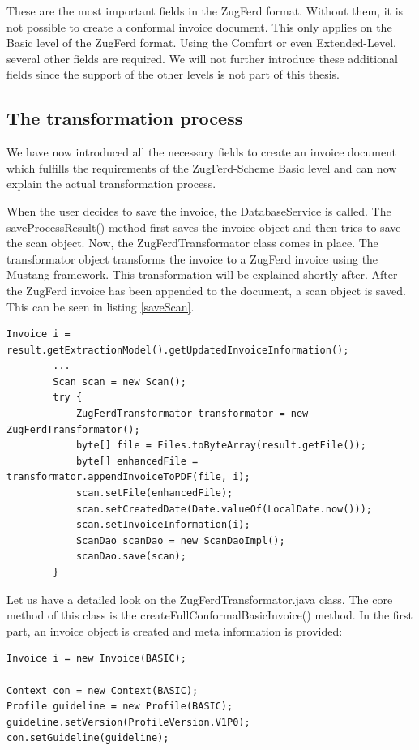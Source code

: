 These are the most important fields in the ZugFerd format. Without them, it is not possible to create a conformal invoice document. This only applies on the Basic level of the ZugFerd format. Using the Comfort or even Extended-Level, several other fields are required. We will not further introduce these additional fields since the support of the other levels is not part of this thesis. 

\subsection{The transformation process}
\label{sec5.7.2}

We have now introduced all the necessary fields to create an invoice document which fulfills the requirements of the ZugFerd-Scheme Basic level and can now explain the actual transformation process. 

When the user decides to save the invoice, the DatabaseService is called. The saveProcessResult() method first saves the invoice object and then tries to save the scan object. Now, the ZugFerdTransformator class comes in place. The transformator object transforms the invoice to a ZugFerd invoice using the Mustang framework. This transformation will be explained shortly after. After the ZugFerd invoice has been appended to the document, a scan object is saved. This can be seen in listing \ref{saveScan}.

\begin{lstlisting}[caption={}, label={saveScan}]
        Invoice i = result.getExtractionModel().getUpdatedInvoiceInformation();
        ...
        Scan scan = new Scan();
        try {
            ZugFerdTransformator transformator = new ZugFerdTransformator();
            byte[] file = Files.toByteArray(result.getFile());
            byte[] enhancedFile = transformator.appendInvoiceToPDF(file, i);
            scan.setFile(enhancedFile);
            scan.setCreatedDate(Date.valueOf(LocalDate.now()));
            scan.setInvoiceInformation(i);
            ScanDao scanDao = new ScanDaoImpl();
            scanDao.save(scan);
        }
\end{lstlisting}

Let us have a detailed look on the ZugFerdTransformator.java class. The core method of this class is the createFullConformalBasicInvoice() method. 
In the first part, an invoice object is created and meta information is provided:

\begin{lstlisting}[caption={Creation of the invoice object}]
Invoice i = new Invoice(BASIC);

Context con = new Context(BASIC);
Profile guideline = new Profile(BASIC);
guideline.setVersion(ProfileVersion.V1P0);
con.setGuideline(guideline);
\end{lstlisting}

